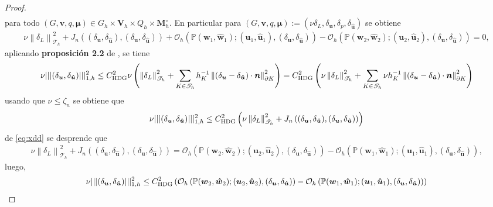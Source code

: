 \documentclass[10pt,a4paper]{report}
\newcommand{\bs}{\boldsymbol}
\newcommand{\Th}{\mathscr{T}_{h}}
\providecommand{\norm}[1]{\left\lVert#1\right\rVert}
\begin{document}
\begin{proof}
\begin{align*}
    \end{align*}
    para todo $\left(G,\bs{v},q,\bs{\mu}\right)\in G_{h}\times\bs{V}_{h}\times Q_{h}\times \bs{M}^{\circ}_{h}$. En particular para $\left(G,\bs{v},q,\bs{\mu}\right) := \left(\nu\delta_{L},\delta_{\bs{u}},\delta_{p},\delta_{\bs{\hat{u}}}\right)$ se obtiene
    \begin{align}
    	\nu \norm{\delta_{L}}^{2}_{\Th} + J_{n}\left((\delta_{\bs{u}},\delta_{\bs{\hat{u}}}),(\delta_{\bs{u}},\delta_{\bs{\hat{u}}})\right) + \mathcal{O}_{h}\left(\mathbb{P}(\bs{w}_{1},\bs{\hat{w}}_{1});(\bs{u}_{1},\bs{\hat{\bs{u}}}_{1}),(\delta_{\bs{u}},\delta_{\bs{\hat{u}}})\right) - \mathcal{O}_{h}\left(\mathbb{P}(\bs{w}_{2},\bs{\hat{w}}_{2});(\bs{u}_{2},\bs{\hat{\bs{u}}}_{2}),(\delta_{\bs{u}},\delta_{\bs{\hat{u}}})\right) = 0,\label{eq:xdd}
    \end{align}
    aplicando \textbf{proposición 2.2} de \cite{CAC2017}, se tiene
    \begin{align*}
    	\nu||| (\delta_{\bs{u}},\delta_{\bs{\hat{u}}}) |||^{2}_{1,h} \leq C^{2}_{\textup{HDG}} \nu \left(\norm{\delta_{L}}^{2}_{\Th} + \sum_{K\in\Th}h^{-1}_{K}\norm{(\delta_{\bs{u}}-\delta_{\bs{\hat{u}}})\cdot \bs{n}}^{2}_{\partial K} \right) = C^{2}_{\textup{HDG}} \left(\nu\norm{\delta_{L}}^{2}_{\Th} + \sum_{K\in\Th}\nu h^{-1}_{K}\norm{(\delta_{\bs{u}}-\delta_{\bs{\hat{u}}})\cdot \bs{n}}^{2}_{\partial K} \right) 
    \end{align*}
    usando que $\nu\leq\zeta_{n}$ se obtiene que 
    \begin{align*}
    	\nu||| (\delta_{\bs{u}},\delta_{\bs{\hat{u}}}) |||^{2}_{1,h}  \leq C^{2}_{\textup{HDG}} \left(\nu\norm{\delta_{L}}^{2}_{\Th} + J_{n}\left((\delta_{\bs{u}},\delta_{\bs{\hat{u}}}),(\delta_{\bs{u}},\delta_{\bs{\hat{u}}})\right) \right) 
    \end{align*}
    de \ref{eq:xdd} se desprende que 
    \begin{align*}
    	\nu\norm{\delta_{L}}^{2}_{\Th} + J_{n}\left((\delta_{\bs{u}},\delta_{\bs{\hat{u}}}),(\delta_{\bs{u}},\delta_{\bs{\hat{u}}})\right) = \mathcal{O}_{h}\left(\mathbb{P}(\bs{w}_{2},\bs{\hat{w}}_{2});(\bs{u}_{2},\bs{\hat{\bs{u}}}_{2}),(\delta_{\bs{u}},\delta_{\bs{\hat{u}}})\right)-\mathcal{O}_{h}\left(\mathbb{P}(\bs{w}_{1},\bs{\hat{w}}_{1});(\bs{u}_{1},\bs{\hat{\bs{u}}}_{1}),(\delta_{\bs{u}},\delta_{\bs{\hat{u}}})\right),
    \end{align*}
    luego,
    \begin{align*}
    	\nu||| (\delta_{\bs{u}},\delta_{\bs{\hat{u}}}) |||^{2}_{1,h}  &\leq C^{2}_{\textup{HDG}}\left(\mathcal{O}_{h}\left(\mathbb{P}(\bs{w}_{2},\bs{\hat{w}}_{2});(\bs{u}_{2},\bs{\hat{\bs{u}}}_{2}),(\delta_{\bs{u}},\delta_{\bs{\hat{u}}})\right)-\mathcal{O}_{h}\left(\mathbb{P}(\bs{w}_{1},\bs{\hat{w}}_{1});(\bs{u}_{1},\bs{\hat{\bs{u}}}_{1}),(\delta_{\bs{u}},\delta_{\bs{\hat{u}}})\right) \right)\\

\end{align*}
\end{proof}
\end{document}
